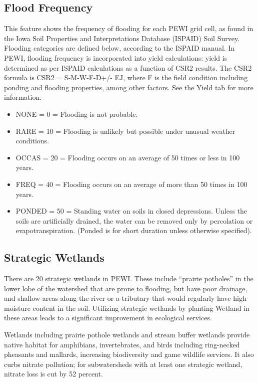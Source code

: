 \documentclass[11pt]{article}
\begin{document}
\subsection{Flood Frequency}
\raggedright
This feature shows the frequency of flooding for each PEWI grid cell, as found in the Iowa Soil Properties and Interpretations Database (ISPAID) Soil Survey.\cite{25}  Flooding categories are defined below, according to the ISPAID manual. In PEWI, flooding frequency is incorporated into yield calculations: yield is determined as per ISPAID calculations as a function of CSR2 results. The CSR2 formula is CSR2 = S-M-W-F-D+/- EJ, where F is the field condition including ponding and flooding properties, among other factors.\cite{26}  See the Yield tab for more information.
\begin{itemize}
\item NONE	=	0	=	Flooding is not probable.
\item RARE	=	10	=	Flooding is unlikely but possible under unusual weather conditions.
\item OCCAS	=	20	=	Flooding occurs on an average of 50 times or less in 100 years.
\item FREQ	=	40	=	Flooding occurs on an average of more than 50 times in 100 years.
\item PONDED	=	50	=	Standing water on soils in closed depressions.  Unless the soils are artificially drained, the water can be removed only by percolation or evapotranspiration.  (Ponded is for short duration unless otherwise specified).
\end{itemize}

\subsection{Strategic Wetlands}

There are 20 strategic wetlands in PEWI. These include “prairie potholes” in the lower lobe of the watershed that are prone to flooding, but have poor drainage, and shallow areas along the river or a tributary that would regularly have high moisture content in the soil. Utilizing strategic wetlands by planting Wetland in these areas leads to a significant improvement in ecological services.

Wetlands including prairie pothole wetlands and stream buffer wetlands provide native habitat for amphibians, invertebrates, and birds including ring-necked pheasants and mallards,\cite{27}  increasing biodiversity and game wildlife services. It also curbs nitrate pollution; for subwatersheds with at least one strategic wetland, nitrate loss is cut by 52 percent.\cite{28}
\end{document}
